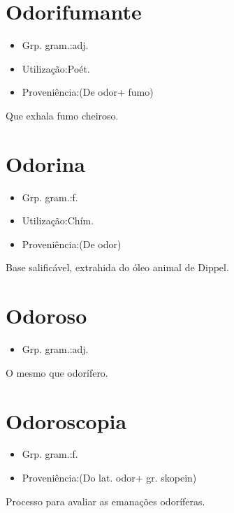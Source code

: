 \section{Odorifumante}
\begin{itemize}
\item {Grp. gram.:adj.}
\end{itemize}
\begin{itemize}
\item {Utilização:Poét.}
\end{itemize}
\begin{itemize}
\item {Proveniência:(De \textunderscore odor\textunderscore  + \textunderscore fumo\textunderscore )}
\end{itemize}
Que exhala fumo cheiroso.
\section{Odorina}
\begin{itemize}
\item {Grp. gram.:f.}
\end{itemize}
\begin{itemize}
\item {Utilização:Chím.}
\end{itemize}
\begin{itemize}
\item {Proveniência:(De \textunderscore odor\textunderscore )}
\end{itemize}
Base salificável, extrahida do óleo animal de Dippel.
\section{Odoroso}
\begin{itemize}
\item {Grp. gram.:adj.}
\end{itemize}
O mesmo que \textunderscore odorífero\textunderscore .
\section{Odoroscopia}
\begin{itemize}
\item {Grp. gram.:f.}
\end{itemize}
\begin{itemize}
\item {Proveniência:(Do lat. \textunderscore odor\textunderscore  + gr. \textunderscore skopein\textunderscore )}
\end{itemize}
Processo para avaliar as emanações odoríferas.
